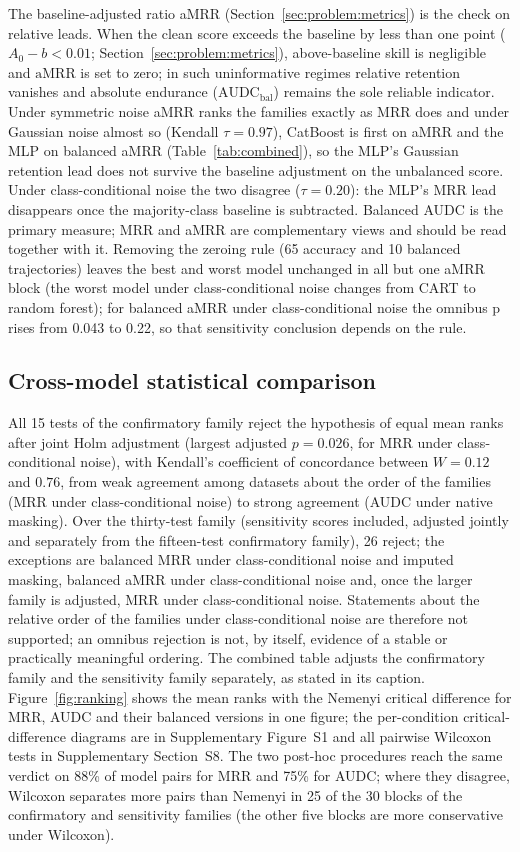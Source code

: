 \documentclass[pdflatex,sn-mathphys]{sn-jnl}
\theoremstyle{thmstyleone}
\theoremstyle{thmstyletwo}
\theoremstyle{thmstylethree}
\newcommand{\AUDC}{\mathrm{AUDC}}
\newcommand{\aMRR}{\mathrm{aMRR}}
\begin{document}
The baseline-adjusted ratio aMRR (Section~\ref{sec:problem:metrics}) is the check on relative leads. When the clean score exceeds the baseline by less than one point ($A_0-b<0.01$; Section~\ref{sec:problem:metrics}), above-baseline skill is negligible and $\aMRR$ is set to zero; in such uninformative regimes relative retention vanishes and absolute endurance ($\AUDC_{\mathrm{bal}}$) remains the sole reliable indicator. Under symmetric noise aMRR ranks the families exactly as MRR does and under Gaussian noise almost so (Kendall $\tau=0.97$), CatBoost is first on aMRR and the MLP on balanced aMRR (Table~\ref{tab:combined}), so the MLP's Gaussian retention lead does not survive the baseline adjustment on the unbalanced score. Under class-conditional noise the two disagree ($\tau=0.20$): the MLP's MRR lead disappears once the majority-class baseline is subtracted. Balanced AUDC is the primary measure; MRR and aMRR are complementary views and should be read together with it. Removing the zeroing rule (65 accuracy and 10 balanced trajectories) leaves the best and worst model unchanged in all but one aMRR block (the worst model under class-conditional noise changes from CART to random forest); for balanced aMRR under class-conditional noise the omnibus p rises from 0.043 to 0.22, so that sensitivity conclusion depends on the rule.

\subsection{Cross-model statistical comparison}\label{sec:res:stats}

All 15 tests of the confirmatory family reject the hypothesis of equal mean ranks after joint Holm adjustment (largest adjusted $p=0.026$, for MRR under class-conditional noise), with Kendall's coefficient of concordance between $W=0.12$ and $0.76$, from weak agreement among datasets about the order of the families (MRR under class-conditional noise) to strong agreement (AUDC under native masking). Over the thirty-test family (sensitivity scores included, adjusted jointly and separately from the fifteen-test confirmatory family), 26 reject; the exceptions are balanced MRR under class-conditional noise and imputed masking, balanced aMRR under class-conditional noise and, once the larger family is adjusted, MRR under class-conditional noise. Statements about the relative order of the families under class-conditional noise are therefore not supported; an omnibus rejection is not, by itself, evidence of a stable or practically meaningful ordering. The combined table adjusts the confirmatory family and the sensitivity family separately, as stated in its caption. Figure~\ref{fig:ranking} shows the mean ranks with the Nemenyi critical difference for MRR, AUDC and their balanced versions in one figure; the per-condition critical-difference diagrams are in Supplementary Figure~S1 and all pairwise Wilcoxon tests in Supplementary Section~S8. The two post-hoc procedures reach the same verdict on 88\% of model pairs for MRR and 75\% for AUDC; where they disagree, Wilcoxon separates more pairs than Nemenyi in 25 of the 30 blocks of the confirmatory and sensitivity families (the other five blocks are more conservative under Wilcoxon).
\end{document}
